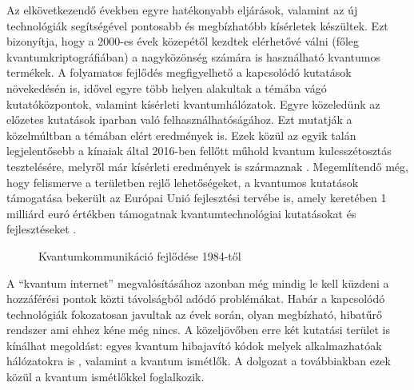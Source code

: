  Az elkövetkezendő években egyre hatékonyabb eljárások, valamint az új technológiák segítségével pontosabb és megbízhatóbb kísérletek készültek. Ezt bizonyítja, hogy a 2000-es évek közepétől kezdtek elérhetővé válni (főleg kvantumkriptográfiában) a nagyközönség számára is használható kvantumos termékek. A folyamatos fejlődés megfigyelhető a kapcsolódó kutatások növekedésén is, idővel egyre több helyen alakultak a témába vágó kutatóközpontok, valamint kísérleti kvantumhálózatok. Egyre közeledünk az előzetes kutatások iparban való felhasználhatóságához. Ezt mutatják a közelmúltban a témában elért eredmények is. Ezek közül az egyik talán legjelentősebb a kínaiak által 2016-ben fellőtt műhold \cite{chinasat} kvantum kulcsszétosztás tesztelésére, melyről már kísérleti eredmények is származnak \cite{yin2017satellite}. Megemlítendő még, hogy felismerve a területben rejlő lehetőségeket, a kvantumos kutatások támogatása bekerült az Európai Unió fejlesztési tervébe is, amely keretében 1 milliárd euró értékben támogatnak kvantumtechnológiai kutatásokat és fejlesztéseket \cite{manifesto}.\\
 \begin{figure}[h]
\centering
{}
\caption[Kvantumkommunikáció timeline]{Kvantumkommunikáció fejlődése 1984-től}
\end{figure}
A ``kvantum internet'' \cite{kimble2008quantum}\cite{pirandola2016unite} megvalósításához azonban még mindig le kell küzdeni a hozzáférési pontok közti távolságból adódó problémákat. Habár a kapcsolódó technológiák fokozatosan javultak az évek során, olyan megbízható, hibatűrő rendszer ami ehhez kéne még nincs. A közeljövőben erre két kutatási terület is kínálhat megoldást: egyes kvantum hibajavító kódok \cite{lidar2013quantum} melyek alkalmazhatóak hálózatokra is \cite{zhang2013quantum}, valamint a kvantum ismétlők\cite{uphoff2016integrated}\cite{krovi2016practical}\cite{pfister2016quantum}\cite{li2016heralded}. A dolgozat a továbbiakban ezek közül a kvantum ismétlőkkel foglalkozik. 



